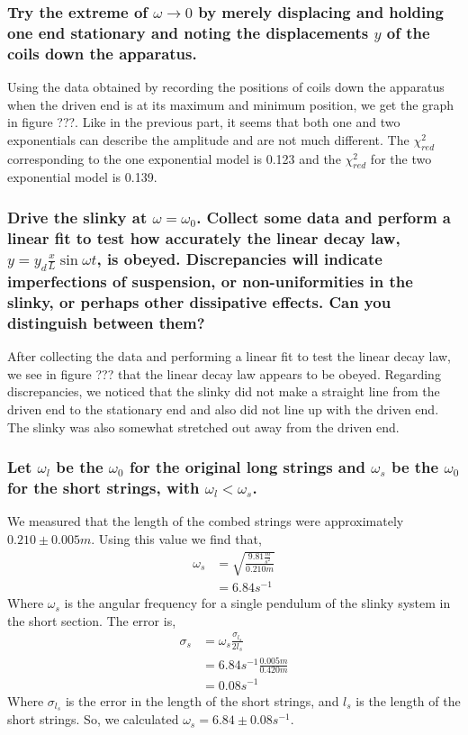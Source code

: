 \documentclass{article}
\begin{document}
\subsubsection*{Try the extreme of $\omega\rightarrow0$ by merely displacing 
and holding one end stationary and noting the displacements $y$ of the coils 
down the apparatus.}
Using the data obtained by recording the positions of coils down the apparatus 
when the driven end is at its maximum and minimum position, we get the graph in
figure ???.  Like in the previous part, it seems that both one and two 
exponentials can describe the amplitude and are not much different.  The 
$\chi_{red}^{2}$ corresponding to the one exponential model is 0.123 and the
$\chi_{red}^{2}$ for the two exponential model is 0.139.

\subsubsection*{Drive the slinky at $\omega=\omega_{0}$.  Collect  some  data  and 
perform a linear fit to test how accurately the linear decay law, 
$y=y_{d}\frac{x}{L}\sin{\omega t}$, is obeyed.  Discrepancies will indicate 
imperfections of suspension, or non-uniformities in the slinky, or perhaps other 
dissipative effects.  Can you distinguish between them?}
After collecting the data and performing a linear fit to test the linear decay law, 
we see in figure ??? that the linear decay law appears to be obeyed.
Regarding discrepancies, we noticed that the slinky did not make a straight line
from the driven end to the stationary end and also did not line up with the 
driven end.  The slinky was also somewhat stretched out away from the driven end.

\subsubsection*{Let $\omega_{l}$ be the $\omega_{0}$ for the original long 
strings and $\omega_{s}$ be the $\omega_{0}$ for the short strings, with 
$\omega_{l}<\omega_{s}$.}
We measured that the length of the combed strings were approximately 
$0.210\pm0.005m$.  Using this value we find that, 
\begin{align*}
    \omega_{s}&=\sqrt{\frac{9.81\frac{m}{s^2}}{0.210m}}\\
    &=6.84s^{-1}
\end{align*}
Where $\omega_{s}$ is the angular frequency for a single pendulum of the slinky
system in the short section.  The error is,
\begin{align*}
    \sigma_{s}&=\omega_{s}\frac{\sigma_{l_{s}}}{2l_{s}}\\
    &=6.84s^{-1}\frac{0.005m}{0.420m}\\
    &=0.08s^{-1}
\end{align*}
Where $\sigma_{l_{s}}$ is the error in the length of the short strings, and 
$l_{s}$ is the length of the short strings.  So, we calculated 
$\omega_{s}=6.84\pm0.08s^{-1}$.
\end{document}
